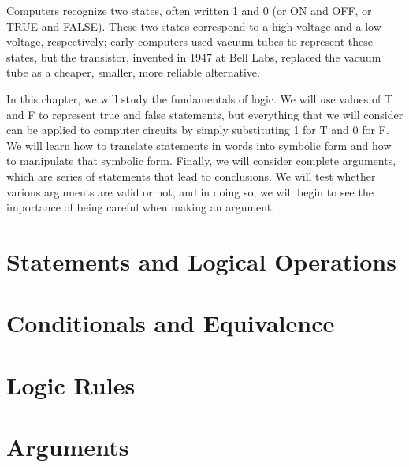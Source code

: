 \documentclass[9pt,letter,twoside,openright]{memoir}
\begin{document}
Computers recognize two states, often written 1 and 0 (or ON and OFF, or TRUE and FALSE).  These two states correspond to a high voltage and a low voltage, respectively; early computers used vacuum tubes to represent these states, but the transistor, invented in 1947 at Bell Labs, replaced the vacuum tube as a cheaper, smaller, more reliable alternative.

In this chapter, we will study the fundamentals of logic.  We will use values of T and F to represent true and false statements, but everything that we will consider can be applied to computer circuits by simply substituting 1 for T and 0 for F.  We will learn how to translate statements in words into symbolic form and how to manipulate that symbolic form.  Finally, we will consider complete arguments, which are series of statements that lead to conclusions.  We will test whether various arguments are valid or not, and in doing so, we will begin to see the importance of being careful when making an argument.
\vfill
\pagebreak

\section{Statements and Logical Operations}



\section{Conditionals and Equivalence}



\section{Logic Rules}



\section{Arguments}


\end{document}
